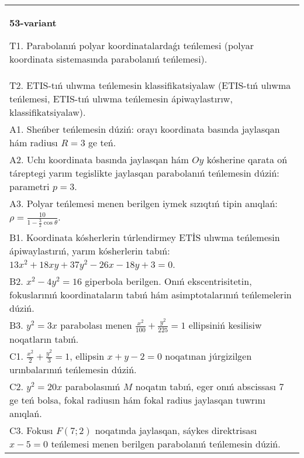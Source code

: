 \documentclass{article}
\begin{document}
\begin{tabular}{m{17cm}}
\textbf{53-variant}
\newline

T1. Parabolanıń polyar koordinatalardaǵı teńlemesi (polyar koordinata sistemasında parabolanıń teńlemesi).\\

T2. ETIS-tıń ulıwma teńlemesin klassifikatsiyalaw (ETIS-tıń ulıwma teńlemesi, ETIS-tıń ulıwma teńlemesin ápiwaylastırıw, klassifikatsiyalaw).\\

A1. Sheńber teńlemesin dúziń: orayı koordinata basında jaylasqan hám radiusı $R=3$ ge teń.\\

A2. Uchı koordinata basında jaylasqan hám $Oy$ kósherine qarata oń táreptegi yarım tegislikte jaylasqan parabolanıń teńlemesin dúziń: parametri $p=3$.\\

A3. Polyar teńlemesi menen berilgen iymek sızıqtıń tipin anıqlań: $\rho=\frac{10}{1-\frac{3}{2}\cos\theta}$.\\

B1. Koordinata kósherlerin túrlendirmey ETİS ulıwma teńlemesin ápiwaylastırıń, yarım kósherlerin tabıń: $13x^{2} + 18xy + 37y^{2} - 26x - 18y + 3 = 0$.  \\

B2. $x^{2} - 4y^{2} = 16$ giperbola berilgen. Onıń ekscentrisitetin, fokuslarınıń koordinataların tabıń hám asimptotalarınıń teńlemelerin dúziń.\\

B3. $y^{2} = 3x$ parabolası menen $\frac{x^{2}}{100} + \frac{y^{2}}{225} = 1$ ellipsiniń kesilisiw noqatların tabıń.  \\

C1. $\frac{x^{2}}{2} + \frac{y^{2}}{3} = 1$, ellipsin $x + y - 2 = 0$ noqatınan júrgizilgen urınbalarınıń teńlemesin dúziń.  \\

C2. $y^{2} = 20x$ parabolasınıń $M$ noqatın tabıń, eger onıń abscissası 7 ge teń bolsa, fokal radiusın hám fokal radius jaylasqan tuwrını anıqlań.\\

C3. Fokusı $F(7;2)$ noqatında jaylasqan, sáykes direktrisası $x - 5 = 0$ teńlemesi menen berilgen parabolanıń teńlemesin dúziń.  \\

\end{tabular}
\vspace{1cm}
\end{document}

